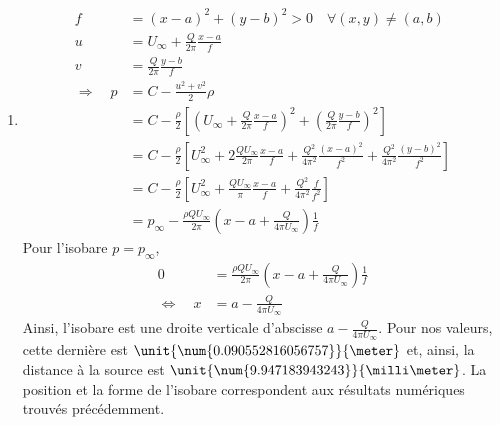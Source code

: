 \documentclass[a4paper, 12pt]{article}
\begin{document}
\begin{enumerate}[label=Q\arabic*.]
\begin{figure}[H]
		\end{figure}
		\item
		\begin{align*}
			f                   & = \left(x - a\right)^2 + \left(y - b\right)^2 > 0 \quad \forall (x,y) \neq (a,b)                                                                                                                        \\
			u                   & = U_\infty + \frac{Q}{2 \pi} \frac{x - a}{f}                                                                                                                                                            \\
			v                   & = \frac{Q}{2 \pi} \frac{y - b}{f}                                                                                                                                                                       \\
			\Rightarrow \quad p & = C - \frac{u^2 + v^2}{2} \rho                                                                                                                                                                          \\
			                    & = C - \frac{\rho}{2} \left[\left(U_\infty + \frac{Q}{2 \pi} \frac{x - a}{f}\right)^2 + \left(\frac{Q}{2 \pi} \frac{y - b}{f}\right)^2 \right]                                                           \\
			                    & = C - \frac{\rho}{2} \left[U_\infty^2 + 2\frac{Q U_\infty}{2 \pi} \frac{x - a}{f} + \frac{Q^2}{4 \pi^2} \frac{\left(x - a\right)^2}{f^2} + \frac{Q^2}{4 \pi^2} \frac{\left(y - b\right)^2}{f^2} \right] \\
			                    & = C - \frac{\rho}{2} \left[U_\infty^2 + \frac{Q U_\infty}{\pi} \frac{x - a}{f} + \frac{Q^2}{4 \pi^2} \frac{f}{f^2}\right]                                                                               \\
			                    & = p_\infty - \frac{\rho Q U_\infty}{2 \pi} \left(x - a + \frac{Q}{4 \pi U_\infty}\right) \frac{1}{f}
		\end{align*}
		Pour l'isobare $p = p_\infty$,
		\begin{align*}
			0                       & = \frac{\rho Q U_\infty}{2 \pi} \left(x - a + \frac{Q}{4 \pi U_\infty}\right) \frac{1}{f} \\
			\Leftrightarrow \quad x & = a - \frac{Q}{4 \pi U_\infty}
		\end{align*}
		Ainsi, l'isobare est une droite verticale d'abscisse $a - \frac{Q}{4 \pi U_\infty}$. Pour nos valeurs, cette dernière est $\unit{\num{0.090552816056757}}{\meter}$ et, ainsi, la distance à la source est $\unit{\num{9.947183943243}}{\milli\meter}$. La position et la forme de l'isobare correspondent aux résultats numériques trouvés précédemment.

\end{enumerate}
\end{document}

